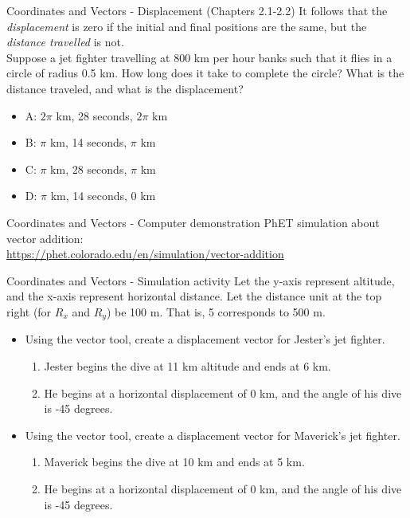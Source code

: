 \documentclass{beamer}
\begin{document}
\begin{frame}{Coordinates and Vectors - Displacement (Chapters 2.1-2.2)}
It follows that the \textit{displacement} is zero if the initial and final positions are the same, but the \textit{distance travelled} is not.\\
\vspace{0.2cm}
\small
Suppose a jet fighter travelling at 800 km per hour banks such that it flies in a circle of radius 0.5 km.  How long does it take to complete the circle?  What is the distance traveled, and what is the displacement?
\begin{itemize}
\item A: $2\pi$ km, 28 seconds, $2\pi$ km
\item B: $\pi$ km, 14 seconds, $\pi$ km
\item C: $\pi$ km, 28 seconds, $\pi$ km
\item D: $\pi$ km, 14 seconds, $0$ km
\end{itemize}
\end{frame}

\begin{frame}{Coordinates and Vectors - Computer demonstration}
PhET simulation about vector addition: \\
\url{https://phet.colorado.edu/en/simulation/vector-addition}
\end{frame}

\begin{frame}{Coordinates and Vectors - Simulation activity}
\small
Let the y-axis represent altitude, and the x-axis represent horizontal distance.  Let the distance unit at the top right (for $R_x$ and $R_y$) be 100 m.  That is, 5 corresponds to 500 m.
\begin{itemize}
\item Using the vector tool, create a displacement vector for Jester's jet fighter.
\begin{enumerate}
\item Jester begins the dive at 11 km altitude and ends at 6 km.
\item He begins at a horizontal displacement of 0 km, and the angle of his dive is -45 degrees.
\end{enumerate}
\item Using the vector tool, create a displacement vector for Maverick's jet fighter.
\begin{enumerate}
\item Maverick begins the dive at 10 km and ends at 5 km.
\item He begins at a horizontal displacement of 0 km, and the angle of his dive is -45 degrees.
\end{enumerate}
\end{itemize}
\end{frame}
\end{document}
